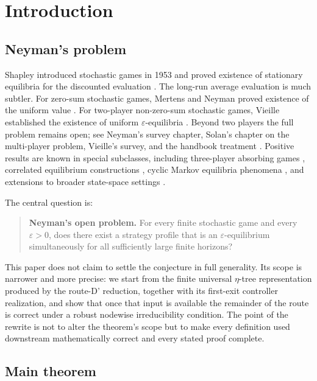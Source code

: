 \documentclass[12pt]{article}
\theoremstyle{definition}
\newcommand{\eps}{\varepsilon}
\newcommand{\1}{\mathbf{1}}
\begin{document}
\tableofcontents

\section{Introduction}

\subsection{Neyman's problem}

Shapley introduced stochastic games in 1953 and proved existence of stationary
equilibria for the discounted evaluation \cite{Shapley1953}. The long-run average
evaluation is much subtler. For zero-sum stochastic games, Mertens and Neyman
proved existence of the uniform value \cite{MertensNeyman1981}. For two-player
non-zero-sum stochastic games, Vieille established the existence of uniform
$\eps$-equilibria \cite{Vieille2000I,Vieille2000II}. Beyond two players the full
problem remains open; see Neyman's survey chapter, Solan's chapter on the
multi-player problem, Vieille's survey, and the handbook treatment
\cite{Neyman2003,Solan2003,Vieille2002,MertensSorinZamir2003}. Positive results
are known in special subclasses, including three-player absorbing games
\cite{Solan1999}, correlated equilibrium constructions \cite{SolanVieille2002},
cyclic Markov equilibria phenomena \cite{FleschThuijsmanVrieze1997}, and extensions
to broader state-space settings \cite{Nowak2003}.

The central question is:
\begin{quote}
\textbf{Neyman's open problem.}
For every finite stochastic game and every $\eps>0$, does there exist a strategy
profile that is an $\eps$-equilibrium simultaneously for all sufficiently large
finite horizons?
\end{quote}

This paper does not claim to settle the conjecture in full generality. Its scope
is narrower and more precise: we start from the finite universal $\eta$-tree
representation produced by the route-D' reduction, together with its first-exit
controller realization, and show that once that input is available the remainder
of the route is correct under a robust nodewise irreducibility condition. The
point of the rewrite is not to alter the theorem's scope but to make every
definition used downstream mathematically correct and every stated proof complete.

\subsection{Main theorem}
\end{document}
